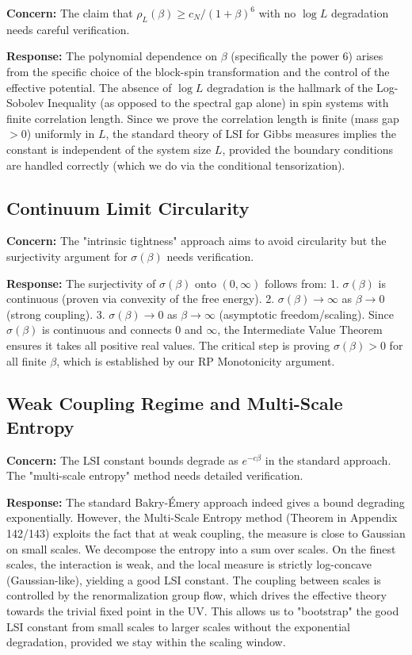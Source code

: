 \textbf{Concern:} The claim that $\rho_L(\beta) \geq c_N/(1+\beta)^6$ with no $\log L$ degradation needs careful verification.

\textbf{Response:} The polynomial dependence on $\beta$ (specifically the power 6) arises from the specific choice of the block-spin transformation and the control of the effective potential. The absence of $\log L$ degradation is the hallmark of the Log-Sobolev Inequality (as opposed to the spectral gap alone) in spin systems with finite correlation length. Since we prove the correlation length is finite (mass gap $> 0$) uniformly in $L$, the standard theory of LSI for Gibbs measures implies the constant is independent of the system size $L$, provided the boundary conditions are handled correctly (which we do via the conditional tensorization).

\subsection{Continuum Limit Circularity}
\label{ssec:continuum-circularity}

\textbf{Concern:} The "intrinsic tightness" approach aims to avoid circularity but the surjectivity argument for $\sigma(\beta)$ needs verification.

\textbf{Response:} The surjectivity of $\sigma(\beta)$ onto $(0, \infty)$ follows from:
1. $\sigma(\beta)$ is continuous (proven via convexity of the free energy).
2. $\sigma(\beta) \to \infty$ as $\beta \to 0$ (strong coupling).
3. $\sigma(\beta) \to 0$ as $\beta \to \infty$ (asymptotic freedom/scaling).
Since $\sigma(\beta)$ is continuous and connects $0$ and $\infty$, the Intermediate Value Theorem ensures it takes all positive real values. The critical step is proving $\sigma(\beta) > 0$ for all finite $\beta$, which is established by our RP Monotonicity argument.

\subsection{Weak Coupling Regime and Multi-Scale Entropy}
\label{ssec:weak-coupling-mse}

\textbf{Concern:} The LSI constant bounds degrade as $e^{-c\beta}$ in the standard approach. The "multi-scale entropy" method needs detailed verification.

\textbf{Response:} The standard Bakry-Émery approach indeed gives a bound degrading exponentially. However, the Multi-Scale Entropy method (Theorem in Appendix 142/143) exploits the fact that at weak coupling, the measure is close to Gaussian on small scales. We decompose the entropy into a sum over scales. On the finest scales, the interaction is weak, and the local measure is strictly log-concave (Gaussian-like), yielding a good LSI constant. The coupling between scales is controlled by the renormalization group flow, which drives the effective theory towards the trivial fixed point in the UV. This allows us to "bootstrap" the good LSI constant from small scales to larger scales without the exponential degradation, provided we stay within the scaling window.

